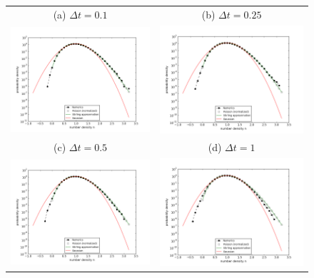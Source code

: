 \documentclass{article}
\begin{document}
\begin{figure}
\begin{center}
\end{center}
\begin{tabular}{cc}
(a) $\Delta t=0.1$ & (b) $\Delta t=0.25$ \\
\includegraphics[width=0.5\linewidth]{fig1/2d_DIFF_dt0.1_hist.png} &
\includegraphics[width=0.5\linewidth]{fig1/2d_DIFF_dt0.25_hist.png} \\
(c) $\Delta t=0.5$ & (d) $\Delta t=1$ \\
\includegraphics[width=0.5\linewidth]{fig1/2d_DIFF_dt0.5_hist.png} &
\includegraphics[width=0.5\linewidth]{fig1/2d_DIFF_dt1_hist.png} \\ 

\end{tabular}
\end{figure}
\end{document}
